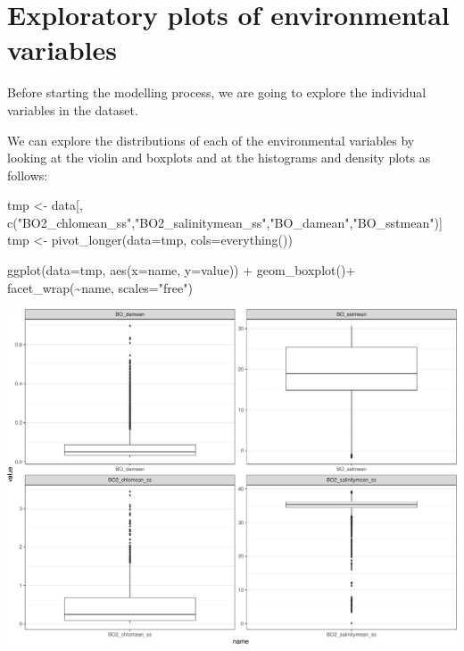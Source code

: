 \documentclass[
]{book}
\newenvironment{Shaded}{\begin{snugshade}}{\end{snugshade}}
\newcommand{\AttributeTok}[1]{\textcolor[rgb]{0.77,0.63,0.00}{#1}}
\newcommand{\FunctionTok}[1]{\textcolor[rgb]{0.00,0.00,0.00}{#1}}
\newcommand{\NormalTok}[1]{#1}
\newcommand{\OtherTok}[1]{\textcolor[rgb]{0.56,0.35,0.01}{#1}}
\newcommand{\SpecialCharTok}[1]{\textcolor[rgb]{0.00,0.00,0.00}{#1}}
\newcommand{\StringTok}[1]{\textcolor[rgb]{0.31,0.60,0.02}{#1}}
\begin{document}
\hypertarget{exploratory-plots-of-environmental-variables}{%
\section{Exploratory plots of environmental variables}\label{exploratory-plots-of-environmental-variables}}

Before starting the modelling process, we are going to explore the individual variables in the dataset.

We can explore the distributions of each of the environmental variables by looking at the violin and boxplots and at the histograms and density plots as follows:

\begin{Shaded}
\begin{Highlighting}[]
\NormalTok{tmp }\OtherTok{\textless{}{-}}\NormalTok{ data[, }\FunctionTok{c}\NormalTok{(}\StringTok{"BO2\_chlomean\_ss"}\NormalTok{,}\StringTok{"BO2\_salinitymean\_ss"}\NormalTok{,}\StringTok{"BO\_damean"}\NormalTok{,}\StringTok{"BO\_sstmean"}\NormalTok{)]}
\NormalTok{tmp }\OtherTok{\textless{}{-}} \FunctionTok{pivot\_longer}\NormalTok{(}\AttributeTok{data=}\NormalTok{tmp, }\AttributeTok{cols=}\FunctionTok{everything}\NormalTok{()) }

\FunctionTok{ggplot}\NormalTok{(}\AttributeTok{data=}\NormalTok{tmp, }\FunctionTok{aes}\NormalTok{(}\AttributeTok{x=}\NormalTok{name, }\AttributeTok{y=}\NormalTok{value)) }\SpecialCharTok{+} 
  \FunctionTok{geom\_boxplot}\NormalTok{()}\SpecialCharTok{+}
  \FunctionTok{facet\_wrap}\NormalTok{(}\SpecialCharTok{\textasciitilde{}}\NormalTok{name, }\AttributeTok{scales=}\StringTok{"free"}\NormalTok{)}
\end{Highlighting}
\end{Shaded}

\includegraphics{_main_files/figure-latex/unnamed-chunk-48-1.pdf}
\end{document}
